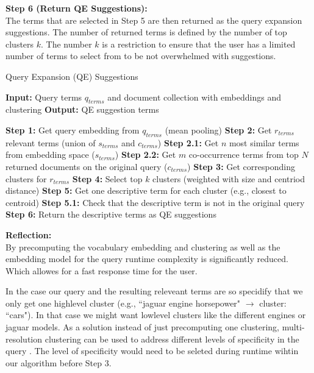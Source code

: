 \textbf{Step 6 (Return QE Suggestions):}\\
The terms that are selected in Step 5 are then returned as the query expansion suggestions. The number of returned terms is defined by the number of top clusters $k$. The number $k$ is a restriction to ensure that the user has a limited number of terms to select from to be not overwhelmed with suggestions.
\begin{algorithm}
    \caption{Query Expansion (QE) Suggestions}
    \label{alg:qe}
    \begin{algorithmic}[1]
        \State \textbf{Input:} Query terms $q_{terms}$ and document collection with embeddings and clustering
        \State \textbf{Output:} QE suggestion terms
        \State
        
        \State \textbf{Step 1:} Get query embedding from $q_{terms}$ (mean pooling)
        \State \textbf{Step 2:} Get $r_{terms}$ relevant terms (union of $s_{terms}$ and $c_{terms}$)
        \State \quad \textbf{Step 2.1:} Get $n$ most similar terms from embedding space ($s_{terms}$)
        \State \quad \textbf{Step 2.2:} Get $m$ co-occurrence terms from top $N$ returned documents on the original query  ($c_{terms}$)
        \State \textbf{Step 3:} Get corresponding clusters for $r_{terms}$
        \State \textbf{Step 4:} Select top $k$ clusters (weighted with size and centriod distance)
        \State \textbf{Step 5:} Get one descriptive term for each cluster (e.g., closest to centroid)
        \State \quad \textbf{Step 5.1:} Check that the descriptive term is not in the original query
        \State \textbf{Step 6:} Return the descriptive terms as QE suggestions
    \end{algorithmic}
\end{algorithm}

\textbf{Reflection:}\\
By precomputing the vocabulary embedding and clustering as well as the embedding model for the query runtime complexity is significantly reduced. Which allowes for a fast response time for the user. 

In the case our query and the resulting releveant terms are so specidify that we only get one highlevel cluster (e.g., ``jaguar engine horsepower" $\rightarrow$ cluster: ``cars"). In that case we might want lowlevel clusters like the different engines or jaguar models. As a solution instead of just precomputing one clustering, multi-resolution clustering can be used to address different levels of specificity in the query \cite{lutov2019accuracy}. The level of specificity would need to be seleted during runtime wihtin our algorithm before Step 3.


